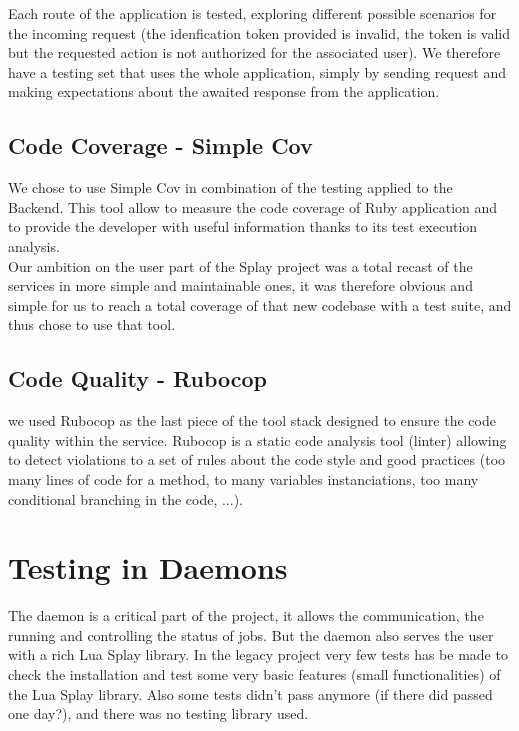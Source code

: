 \documentclass{eplmastersthesis}
\begin{document}
          Each route of the application is tested, exploring different possible
          scenarios for the incoming request (the idenfication token provided
          is invalid, the token is valid but the requested action is not
          authorized for the associated user). We therefore have a testing set
          that uses the whole application, simply by sending request and
          making expectations about the awaited response from the application.

      \subsection{Code Coverage - Simple Cov}

        We chose to use Simple Cov in combination of the testing applied to
        the Backend. This tool allow to measure the code coverage of Ruby
        application and to provide the developer with useful information
        thanks to its test execution analysis.\\

        Our ambition on the user part of the Splay project was a total recast of
        the services in more simple and maintainable ones, it was therefore
        obvious and simple for us to reach a total coverage of that new codebase
        with a test suite, and thus chose to use that tool.

      \subsection{Code Quality - Rubocop}

        we used Rubocop as the last piece of the tool stack designed to ensure
        the code quality within the service. Rubocop is a static code analysis
        tool (linter) allowing to detect violations to a set of rules about
        the code style and good practices (too many lines of code for a method,
        to many variables instanciations, too many conditional branching
        in the code, ...).

    \section{Testing in Daemons}
      
      The daemon is a critical part of the project, it allows the communication, the running
      and controlling the status of jobs. But the daemon also serves the user with a rich Lua Splay library.
      In the legacy project very few tests has be made to check the installation and 
      test some very basic features (small functionalities) of the Lua Splay library. Also some tests didn't pass anymore
      (if there did passed one day?), and there was no testing library used. \\
\end{document}
